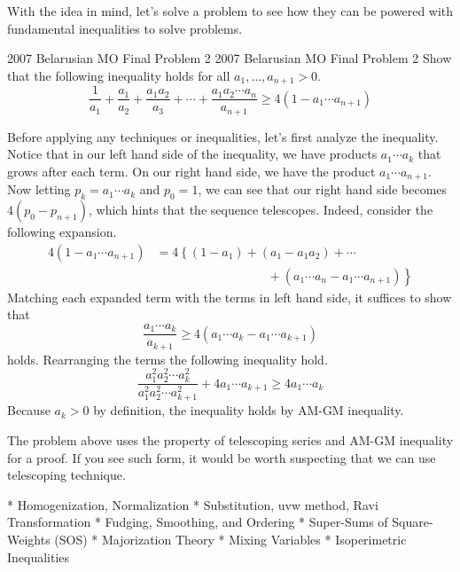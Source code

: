 \documentclass[../../main.tex]{subfiles}
\begin{document}
With the idea in mind, let's solve a problem to see how they can
be powered with fundamental inequalities to solve problems.

\begin{problem}
{2007 Belarusian MO Final Problem 2 \easy}
{2007 Belarusian MO Final Problem 2}
Show that the following inequality holds for all $a_1, \ldots,
a_{n+1} > 0$.
\[
\frac{1}{a_1} + \frac{a_1}{a_2} + \frac{a_1 a_2}{a_3} + \cdots +
    \frac{a_1 a_2 \cdots a_n}{a_{n+1}}
\geq 4(1 - a_1 \cdots a_{n+1})
\]
\end{problem}
\begin{solution}
Before applying any techniques or inequalities, let's first analyze
the inequality. Notice that in our left hand side of the inequality,
we have products $a_1 \cdots a_k$ that grows after each term.
On our right hand side, we have the product $a_1 \cdots a_{n+1}$.
Now letting $p_k = a_1 \cdots a_k$ and $p_0 = 1$, we can see that
our right hand side becomes $4(p_0 - p_{n+1})$, which hints that
the sequence telescopes. Indeed, consider the following expansion.
\begin{align*}
    4(1 - a_1 \cdots a_{n+1})
    &= 4 \left\{ (1 - a_1) + (a_1 - a_1 a_2) + \cdots \right. \\
    &\qquad\qquad\qquad\qquad\quad+\left.
        (a_1 \cdots a_{n} - a_1 \cdots a_{n+1})
    \right\}
\end{align*}
Matching each expanded term with the terms in left hand side,
it suffices to show that
\[
\frac{a_1 \cdots a_k}{a_{k+1}}
\geq 4(a_1 \cdots a_k - a_1 \cdots a_{k+1})
\]
holds. Rearranging the terms the following inequality hold.
\[
\frac{a_1^2 a_2^2 \cdots a_k^2}{a_1^2 a_2^2 \cdots a_{k+1}^2}
    + 4 a_1 \cdots a_{k+1}
\geq 4 a_1 \cdots a_k
\]
Because $a_k > 0$ by definition, the inequality holds by AM-GM
inequality.
\end{solution}

The problem above uses the property of telescoping series and
AM-GM inequality for a proof. If you see such form, it would be worth
suspecting that we can use telescoping technique.







* Homogenization, Normalization
* Substitution, uvw method, Ravi Transformation
* Fudging, Smoothing, and Ordering
* Super-Sums of Square-Weights (SOS)
* Majorization Theory
* Mixing Variables
* Isoperimetric Inequalities
\end{document}
